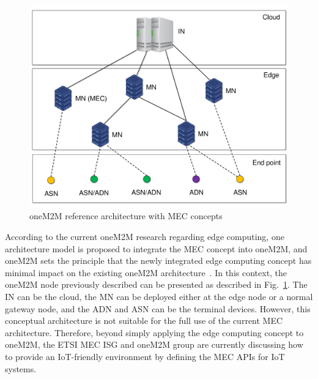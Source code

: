 \begin{figure}[tb!]
\centering
\includegraphics[width=1\columnwidth]
{figures/fig_IoT_slicing_onem2m_mec.pdf}
\caption{oneM2M reference architecture with MEC concepts}
\label{fig:onem2m_mec_perspective}
\end{figure}

According to the current oneM2M research regarding edge computing, one architecture model is proposed to integrate the MEC concept into oneM2M, and oneM2M sets the principle that the newly integrated edge computing concept has minimal impact on the existing oneM2M architecture~\cite {2020_onem2m_tr_0052}. In this context, the oneM2M node previously described can be presented as described in Fig.~\ref{fig:onem2m_mec_perspective}. The IN can be the cloud, the MN can be deployed either at the edge node or a normal gateway node, and the ADN and ASN can be the terminal devices. However, this conceptual architecture is not suitable for the full use of the current MEC architecture. Therefore, beyond simply applying the edge computing concept to oneM2M, the ETSI MEC ISG and oneM2M group are currently discussing how to provide an IoT-friendly environment by defining the MEC APIs for IoT systems.


